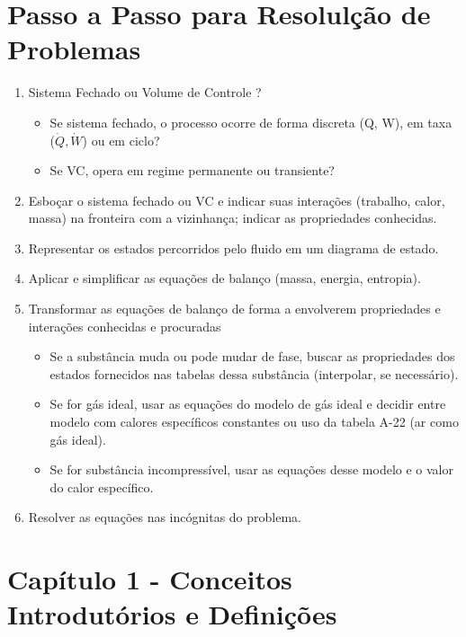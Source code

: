\documentclass[a4paper, 12pt]{article}
\begin{document}
\section{Passo a Passo para Resolulção de Problemas}
	\begin{enumerate}
		\item Sistema Fechado ou Volume de Controle ?	
			\begin{itemize}
				\item Se sistema fechado, o processo ocorre de forma discreta (Q, W), em taxa ($ \dot{Q}, \dot{W} $) ou em ciclo?
				\item Se VC, opera em regime permanente ou transiente?
			\end{itemize}
		\item Esboçar o sistema fechado ou VC e indicar suas interações (trabalho, calor, massa)
		na fronteira com a vizinhança; indicar as propriedades conhecidas.
		\item Representar os estados percorridos pelo fluido em um diagrama de estado.
		\item Aplicar e simplificar as equações de balanço (massa, energia, entropia).
		\item Transformar as equações de balanço de forma a envolverem propriedades e
		interações conhecidas e procuradas
			\begin{itemize}
				\item Se a substância muda ou pode mudar de fase, buscar as propriedades dos estados fornecidos
				nas tabelas dessa substância (interpolar, se necessário).
				\item Se for gás ideal, usar as equações do modelo de gás ideal e decidir entre modelo com calores
				específicos constantes ou uso da tabela A-22 (ar como gás ideal).
				\item Se for substância incompressível, usar as equações desse modelo e o valor do calor específico.
			\end{itemize}
		\item Resolver as equações nas incógnitas do problema.
	\end{enumerate}

\newpage
\section{Capítulo 1 - Conceitos Introdutórios e Definições}
\end{document}
